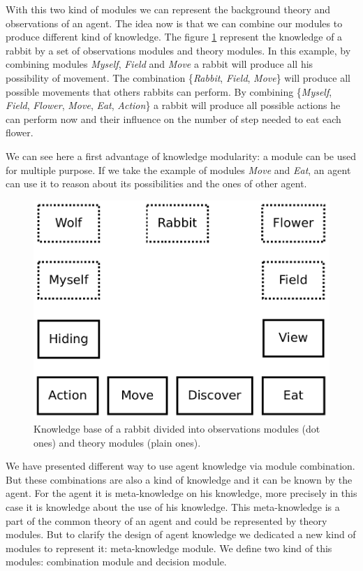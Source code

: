 \documentclass{aamas2012}
\begin{document}
	With this two kind of modules we can represent the background theory and observations of an agent.
	The idea now is that we can combine our modules to produce different kind of knowledge.
	The figure \ref{module_combination} represent the knowledge of a rabbit by a set of observations modules and theory modules.
	In this example, by combining modules \emph{Myself}, \emph{Field} and \emph{Move} a rabbit will produce all his possibility of movement.
	The combination \{\emph{Rabbit}, \emph{Field}, \emph{Move}\} will produce all possible movements that others rabbits can perform. 
	By combining \{\emph{Myself}, \emph{Field}, \emph{Flower}, \emph{Move}, \emph{Eat}, \emph{Action}\} 
	a rabbit will produce all possible actions he can perform now and their influence on the number of step needed to eat each flower.
	
	We can see here a first advantage of knowledge modularity: a module can be used for multiple purpose.
	If we take the example of modules \emph{Move} and \emph{Eat}, an agent can use it to reason about its possibilities and the ones of other agent.
	
	\begin{figure}
		\centering
		\includegraphics[keepaspectratio=true, scale=0.4]{module_combination.pdf}
		\caption
		{
			\label{module_combination}
			Knowledge base of a rabbit divided into observations modules (dot ones) and theory modules (plain ones).
		}
	\end{figure}

	We have presented different way to use agent knowledge via module combination.
	But these combinations are also a kind of knowledge and it can be known by the agent.
	For the agent it is meta-knowledge on his knowledge, more precisely in this case it is knowledge about the use of his knowledge.
	This meta-knowledge is a part of the common theory of an agent and could be represented by theory modules.
	But to clarify the design of agent knowledge we dedicated a new kind of modules to represent it: meta-knowledge module.
	We define two kind of this modules: combination module and decision module.
	
\end{document}
